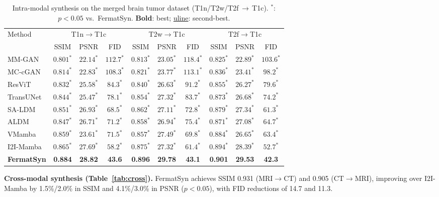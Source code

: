 \documentclass[runningheads]{llncs}
\begin{document}
\begin{table}[t]
\caption{Intra-modal synthesis on the merged brain tumor dataset
  (T1n/T2w/T2f\,$\to$\,T1c). $^*$: $p{<}0.05$ vs.\ FermatSyn.
  \textbf{Bold}: best; \underline{uline}: second-best.}
\label{tab:intra}
\centering
\setlength{\tabcolsep}{2.5pt}
\fontsize{7}{8.5}\selectfont
\begin{tabular}{lccccccccc}
\toprule
\multirow{2}{*}{Method}
  & \multicolumn{3}{c}{T1n$\to$T1c}
  & \multicolumn{3}{c}{T2w$\to$T1c}
  & \multicolumn{3}{c}{T2f$\to$T1c} \\
\cmidrule(lr){2-4}\cmidrule(lr){5-7}\cmidrule(lr){8-10}
  & SSIM & PSNR & FID & SSIM & PSNR & FID & SSIM & PSNR & FID \\
\midrule
MM-GAN~\cite{sharma2019missing}
  &$0.801^*$&$22.14^*$&$112.7^*$ &$0.813^*$&$23.05^*$&$118.4^*$ &$0.825^*$&$22.89^*$&$103.6^*$ \\
MC-cGAN~\cite{dar2019image}
  &$0.814^*$&$22.83^*$&$108.3^*$ &$0.821^*$&$23.77^*$&$113.1^*$ &$0.836^*$&$23.41^*$&$98.2^*$ \\
ResViT~\cite{Dalmaz2022ResViT}
  &$0.832^*$&$25.58^*$&$84.3^*$  &$0.840^*$&$26.63^*$&$91.2^*$  &$0.855^*$&$26.27^*$&$79.6^*$ \\
TransUNet~\cite{chen2021transunet}
  &$0.844^*$&$25.47^*$&$78.1^*$  &$0.854^*$&$27.32^*$&$83.7^*$  &$0.873^*$&$26.68^*$&$74.2^*$ \\
SA-LDM~\cite{zhang2025structure}
  &$0.851^*$&$26.93^*$&$68.5^*$  &$0.862^*$&$27.11^*$&$72.8^*$  &$0.879^*$&$27.34^*$&$61.3^*$ \\
ALDM~\cite{Kim_2024_WACV}
  &$0.847^*$&$26.71^*$&$71.2^*$  &$0.858^*$&$26.94^*$&$75.4^*$  &$0.871^*$&$27.08^*$&$64.7^*$ \\
VMamba~\cite{Liu2024VMamba}
  &$0.859^*$&$23.61^*$&$71.5^*$  &$0.857^*$&$27.49^*$&$69.8^*$  &$0.884^*$&$26.65^*$&$63.4^*$ \\
I2I-Mamba~\cite{xing2024i2imamba}
  &\underline{$0.865^*$}&\underline{$27.69^*$}&\underline{$58.2^*$}
  &\underline{$0.875^*$}&\underline{$27.32^*$}&\underline{$61.4^*$}
  &\underline{$0.894^*$}&\underline{$28.39^*$}&\underline{$52.7^*$} \\
\midrule
\textbf{FermatSyn}
  &\textbf{0.884}&\textbf{28.82}&\textbf{43.6}
  &\textbf{0.896}&\textbf{29.78}&\textbf{43.1}
  &\textbf{0.901}&\textbf{29.53}&\textbf{42.3} \\
\bottomrule
\end{tabular}
\end{table}

\noindent\textbf{Cross-modal synthesis (Table~\ref{tab:cross}).}
FermatSyn achieves SSIM 0.931 (MRI$\to$CT) and 0.905 (CT$\to$MRI),
improving over I2I-Mamba by 1.5\%/2.0\% in SSIM and 4.1\%/3.0\% in
PSNR ($p{<}0.05$), with FID reductions of 14.7 and 11.3.
\end{document}

